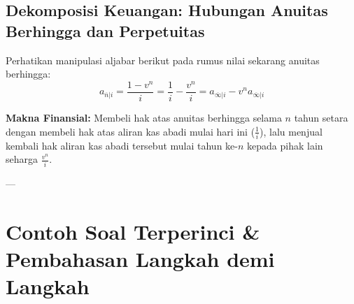\documentclass[11pt,a4paper]{article}
\begin{document}
\subsection{Dekomposisi Keuangan: Hubungan Anuitas Berhingga dan Perpetuitas}

Perhatikan manipulasi aljabar berikut pada rumus nilai sekarang anuitas berhingga:
\begin{equation}
    a_{\overline{n}|i} = \frac{1 - v^n}{i} = \frac{1}{i} - \frac{v^n}{i} = a_{\overline{\infty}|i} - v^n a_{\overline{\infty}|i}
\end{equation}

\begin{center}
\end{center}

\textbf{Makna Finansial:} Membeli hak atas anuitas berhingga selama $n$ tahun setara dengan membeli hak atas aliran kas abadi mulai hari ini ($\frac{1}{i}$), lalu menjual kembali hak aliran kas abadi tersebut mulai tahun ke-$n$ kepada pihak lain seharga $\frac{v^n}{i}$.

---

\section{Contoh Soal Terperinci \& Pembahasan Langkah demi Langkah}
\end{document}
